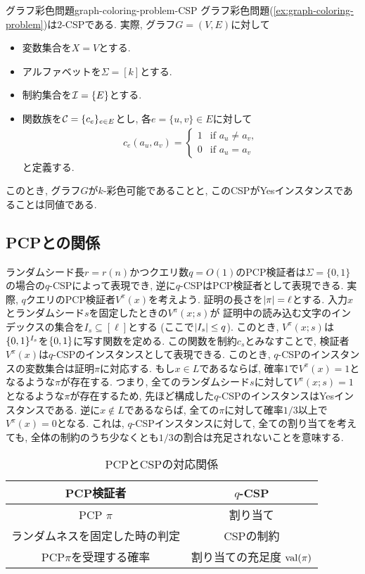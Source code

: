 \begin{example}{グラフ彩色問題}{graph-coloring-problem-CSP}
  グラフ彩色問題(\cref{ex:graph-coloring-problem})は$2$-CSPである.
  実際, グラフ$G=(V,E)$に対して
  \begin{itemize}
    \item 変数集合を$X=V$とする.
    \item アルファベットを$\Sigma=[k]$とする.
    \item 制約集合を$\mathcal{I}=\{E\}$とする.
    \item 関数族を$\mathcal{C}=\{c_e\}_{e\in E}$とし, 各$e=\{u,v\}\in E$に対して
    \begin{align*}
      c_e(a_u,a_v) = \begin{cases}
        1 & \text{if } a_u\neq a_v, \\
        0 & \text{if } a_u=a_v
      \end{cases}
    \end{align*}
    と定義する.
  \end{itemize}
  このとき, グラフ$G$が$k$-彩色可能であることと, このCSPがYesインスタンスであることは同値である.
\end{example}


\subsection{PCPとの関係}
ランダムシード長$r=r(n)$かつクエリ数$q=O(1)$のPCP検証者は$\Sigma=\{0,1\}$の場合の$q$-CSPによって表現でき, 逆に$q$-CSPはPCP検証者として表現できる.
実際, $q$クエリのPCP検証者$V^\pi(x)$を考えよう.
証明の長さを$\abs{\pi}=\ell$とする.
入力$x$とランダムシード$s$を固定したときの$V^\pi(x;s)$が
証明中の読み込む文字のインデックスの集合を$I_s\subseteq[\ell]$とする (ここで$\abs{I_s}\le q$).
このとき, $V^\pi(x;s)$は$\{0,1\}^{I_s}$を$\{0,1\}$に写す関数を定める.
この関数を制約$c_s$とみなすことで, 検証者$V^\pi(x)$は$q$-CSPのインスタンスとして表現できる.
このとき, $q$-CSPのインスタンスの変数集合は証明$\pi$に対応する.
もし$x\in L$であるならば, 確率$1$で$V^\pi(x)=1$となるような$\pi$が存在する.
つまり, 全てのランダムシード$s$に対して$V^\pi(x;s)=1$となるような$\pi$が存在するため,
先ほど構成した$q$-CSPのインスタンスはYesインスタンスである.
逆に$x\not\in L$であるならば, 全ての$\pi$に対して確率$1/3$以上で$V^\pi(x)=0$となる.
これは, $q$-CSPインスタンスに対して, 全ての割り当てを考えても, 全体の制約のうち少なくとも$1/3$の割合は充足されないことを意味する.


\begin{table}[htbp]
  \centering
  \begin{tabular}{|c|c|}
    \hline
    PCP検証者 & $q$-CSP \\
    \hline
    PCP $\pi$ & 割り当て \\
    \hline
    ランダムネスを固定した時の判定 & CSPの制約 \\
    \hline
    PCP$\pi$を受理する確率 & 割り当ての充足度 $\mathrm{val}(\pi)$ \\
    \hline
  \end{tabular}
  \caption{PCPとCSPの対応関係}
  \label{table:pcp-csp-correspondence}
\end{table}

